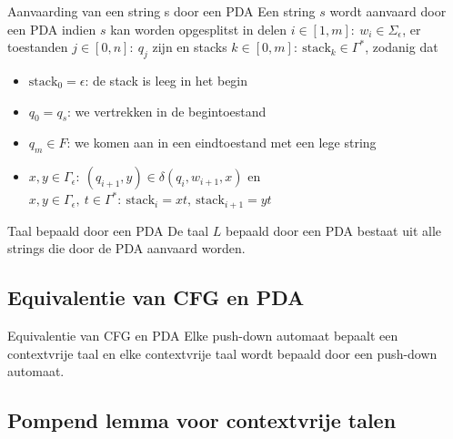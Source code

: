 \begin{theo}{Aanvaarding van een string s door een PDA}
    Een string $s$ wordt aanvaard door een PDA indien $s$ kan worden opgesplitst in delen $i \in [1,m]: \ w_i \in \Sigma_\epsilon$, er toestanden $j \in [0,n]: \ q_j$ zijn en 
    stacks $k \in [0,m]: \ \text{stack}_k \in \Gamma^*$, zodanig dat 
    \begin{itemize}
        \item $\text{stack}_0 = \epsilon$: de stack is leeg in het begin
        \item $q_0 = q_s$: we vertrekken in de begintoestand
        \item $q_m \in F$: we komen aan in een eindtoestand met een lege string
        \item $x,y \in \Gamma_\epsilon: \ (q_{i+1},y) \in \delta(q_i,w_{i+1},x)$ en $x,y \in \Gamma_\epsilon, \ t \in \Gamma^*: \ \text{stack}_i = xt, \ \text{stack}_{i+1} = yt$
    \end{itemize}  
    \vspace{-0.3cm}
\end{theo}

\begin{theo}{Taal bepaald door een PDA}
    \vspace{-0.1cm}
    De taal $L$ bepaald door een PDA bestaat uit alle strings die door de PDA
    aanvaard worden.
    \vspace{-0.1cm}
\end{theo}

\subsection{Equivalentie van CFG en PDA}

\vspace{0.5cm}

\begin{lem}{Equivalentie van CFG en PDA}
    \vspace{-0.1cm}
    Elke push-down automaat bepaalt een contextvrije taal en elke contextvrije taal wordt bepaald door een push-down automaat.
    \vspace{-0.1cm}
\end{lem}

\subsection{Pompend lemma voor contextvrije talen}

